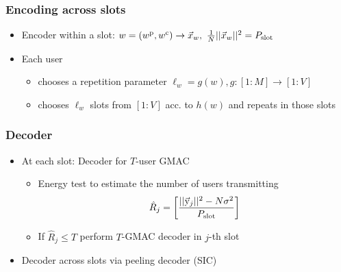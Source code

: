 \begin{frame}
\frametitle{Encoding across slots}
\begin{itemize}
	\item Encoder within a slot: $w=(w^\mathrm{p},w^\mathrm{c})\rightarrow \vec{x}_w,~\frac{1}{N}||\vec{x}_w||^2=P_{\text{slot}}$
	\item Each user 
	\begin{itemize}
		\item chooses a repetition parameter $\ell_{w}=g(w), g:[1:M] \rightarrow [1:V]$ 
		\item chooses $\ell_{w}$ slots from $[1:V]$ acc. to $h(w)$ and repeats in those slots
	\end{itemize}
\end{itemize}
	\centering
\resizebox{0.7\textwidth}{!}{}	
\end{frame}


\begin{frame}
\frametitle{Decoder}
\begin{itemize}
\item At each slot: Decoder for $T$-user GMAC
	\begin{itemize}
	\item Energy test to estimate the number of users transmitting
	\[
	\hat{R}_{j}= \left[\frac{||\vec{\mathrm{y}}_j||^2-N\sigma^2}{P_{\text{slot}}}\right]
	\]
	\item If $	\hat{R}_{j}\leq T$ perform $T$-GMAC decoder in $j$-th slot 
	\end{itemize}
\item Decoder across slots via peeling decoder (SIC)
\end{itemize}
\vspace{2ex}
\centering
\resizebox{0.7\textwidth}{!}{}	
\end{frame}

